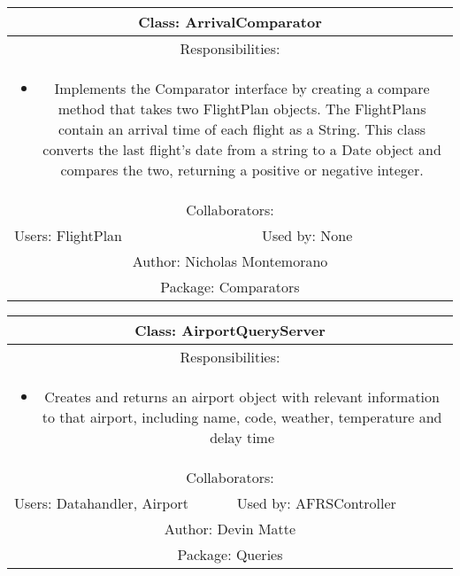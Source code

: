 \begin{center}
    \begin{tabular}{ |p{7cm}|p{7cm}|  }
        \hline
        \multicolumn{2}{|c|}{Class: ArrivalComparator} \\
        \hline
        \multicolumn{2}{|c|}{Responsibilities:} \\ \multicolumn{2}{|c|}{\parbox{0.9\textwidth}{
        \begin{itemize}
            \item Implements the Comparator interface by creating a compare method that takes two FlightPlan objects. The FlightPlans contain an arrival time of each flight as a String. This class converts the last flight’s date from a string to a Date object and compares the two, returning a positive or negative integer.
        \end{itemize} }} \\
        \hline
        \multicolumn{2}{|c|}{Collaborators:} \\
        \hline
        Users: FlightPlan & Used by: None \\
        \hline
        \multicolumn{2}{|c|}{Author: Nicholas Montemorano} \\
        \hline
        \multicolumn{2}{|c|}{Package: Comparators} \\
        \hline
    \end{tabular}
\end{center}

\begin{center}
    \begin{tabular}{ |p{7cm}|p{7cm}|  }
        \hline
        \multicolumn{2}{|c|}{Class: AirportQueryServer} \\
        \hline
        \multicolumn{2}{|c|}{Responsibilities:} \\ \multicolumn{2}{|c|}{\parbox{0.9\textwidth}{
        \begin{itemize}
            \item Creates and returns an airport object with relevant information to that airport, including name, code, weather, temperature and delay time
        \end{itemize} }} \\
        \hline
        \multicolumn{2}{|c|}{Collaborators:} \\
        \hline
        Users: Datahandler, Airport & Used by: AFRSController \\
        \hline
        \multicolumn{2}{|c|}{Author: Devin Matte} \\
        \hline
        \multicolumn{2}{|c|}{Package: Queries} \\
        \hline
    \end{tabular}
\end{center}

